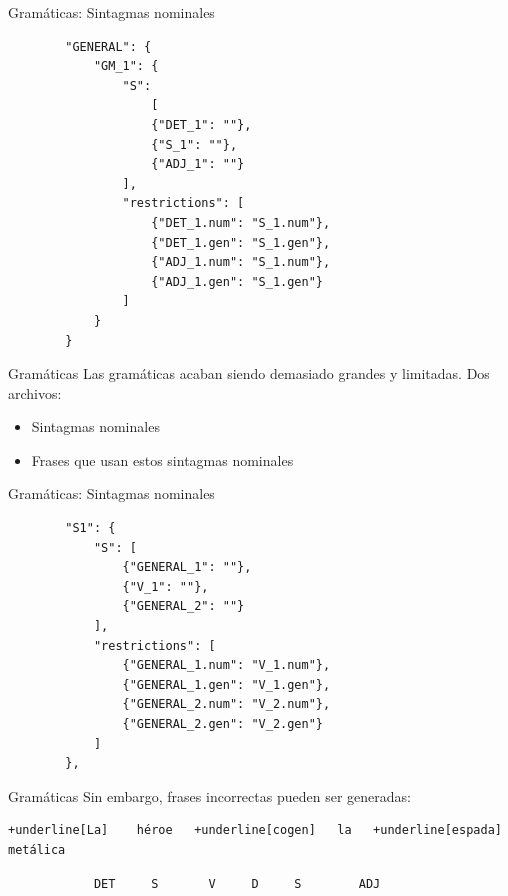 \begin{frame}[t, fragile]{Gramáticas: Sintagmas nominales}
	\begin{verbatim}
		"GENERAL": {
        	"GM_1": {
            	"S": 
                	[
	                {"DET_1": ""}, 
	                {"S_1": ""},
	                {"ADJ_1": ""}
	            ],
	            "restrictions": [
	                {"DET_1.num": "S_1.num"},
	                {"DET_1.gen": "S_1.gen"},
	                {"ADJ_1.num": "S_1.num"},
	                {"ADJ_1.gen": "S_1.gen"}
	            ]
	        }
    	}
	\end{verbatim}
\end{frame}

\begin{frame}[t, fragile]{Gramáticas}
	Las gramáticas acaban siendo demasiado grandes y limitadas. Dos archivos:
	\begin{itemize}
		\item Sintagmas nominales
		\item<+-| alert@+> Frases que usan estos sintagmas nominales
	\end{itemize}
\end{frame}

\begin{frame}[t, fragile]{Gramáticas: Sintagmas nominales}
	\begin{verbatim}
		"S1": {
            "S": [
                {"GENERAL_1": ""},
                {"V_1": ""},
                {"GENERAL_2": ""}
            ],
            "restrictions": [
                {"GENERAL_1.num": "V_1.num"},
                {"GENERAL_1.gen": "V_1.gen"},
                {"GENERAL_2.num": "V_2.num"},
                {"GENERAL_2.gen": "V_2.gen"}
            ]
        },
	\end{verbatim}
\end{frame}

\begin{frame}[t, fragile]{Gramáticas}
Sin embargo, frases incorrectas pueden ser generadas:
	\vspace*{\fill}
		\begin{Verbatim}[commandchars=+\[\]]
+underline[La]    héroe   +underline[cogen]   la   +underline[espada]   metálica
		\end{Verbatim}
		\begin{verbatim}
			DET     S       V     D     S        ADJ
		\end{verbatim}
	\vspace*{\fill}
\end{frame}

